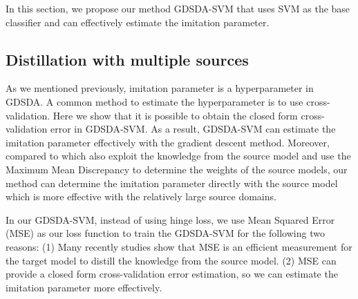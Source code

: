 In this section, we propose our method GDSDA-SVM that uses SVM as the base classifier and can effectively estimate the imitation parameter.
\subsection{Distillation with multiple sources}
As we mentioned previously, imitation parameter is a hyperparameter in GDSDA. A common method to estimate the hyperparameter is to use cross-validation.
Here we show that it is possible to obtain the closed form cross-validation error\cite{cawley2006leave} in GDSDA-SVM.
As a result,  GDSDA-SVM can estimate the imitation parameter effectively with the gradient descent method. Moreover, compared to \cite{duan2009domain} which also exploit the knowledge from the source model and use the Maximum Mean Discrepancy to determine the weights of the source models, our method can determine the imitation parameter directly with the source model which is more effective with the relatively large source domains.

In our GDSDA-SVM, instead of using hinge loss, we use Mean Squared Error (MSE) as our loss function to train the GDSDA-SVM for the following two reasons: (1) Many recently studies \cite{ba2014deep,luo2016face,romero2014fitnets,urban2016deep} show that MSE is an efficient measurement for the target model to distill the knowledge from the source model. (2) MSE can provide a closed form cross-validation error estimation, so we can estimate the imitation parameter more effectively. 

